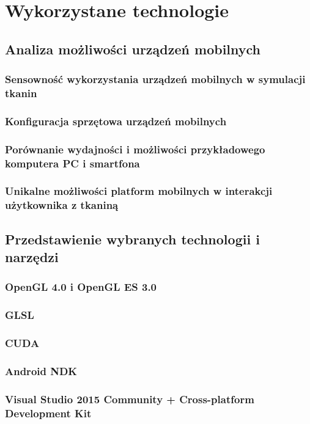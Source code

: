\chapter{Wykorzystane technologie}
\label{t:technologie}


	\section{Analiza możliwości urządzeń mobilnych}
	\label{t:technologie:mobilne}
	
		\subsection{Sensowność wykorzystania urządzeń mobilnych w symulacji tkanin}
		\label{t:technologie:mobilne:dlaczego}
	
		\subsection{Konfiguracja sprzętowa urządzeń mobilnych}
		\label{t:technologie:mobilne:konfiguracja}
		
		\subsection{Porównanie wydajności i możliwości przykładowego komputera PC i smartfona}
		\label{t:technologie:mobilne:porownanie}
		
		\subsection{Unikalne możliwości platform mobilnych w interakcji użytkownika z tkaniną}
		\label{t:technologie:mobilne:interakcja}

	
	\section{Przedstawienie wybranych technologii i narzędzi}
	\label{t:technologie:narzedzia}
	
		\subsection{OpenGL 4.0 i OpenGL ES 3.0}
		\label{t:technologie:narzedzia:ogl}
		
		\subsection{GLSL}
		\label{t:technologie:narzedzia:glsl}
		
		\subsection{CUDA}
		\label{t:technologie:narzedzia:cuda}
		
		\subsection{Android NDK}
		\label{t:technologie:narzedzia:ndk}
		
		\subsection{Visual Studio 2015 Community + Cross-platform Development Kit}
		\label{t:technologie:narzedzia:vs}